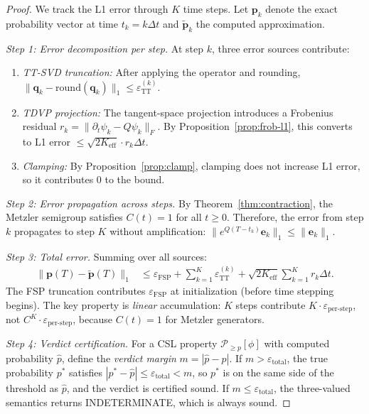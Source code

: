 \documentclass[11pt]{article}
\newcommand{\norm}[1]{\lVert #1 \rVert}
\begin{document}
\begin{proof}
We track the L1 error through $K$ time steps.
Let $\mathbf{p}_k$ denote the exact probability vector at time $t_k = k\Delta t$
and $\tilde{\mathbf{p}}_k$ the computed approximation.

\emph{Step 1: Error decomposition per step.}
At step $k$, three error sources contribute:
\begin{enumerate}[label=(\alph*)]
\item \emph{TT-SVD truncation:} After applying the operator and rounding,
  $\norm{\mathbf{q}_k - \mathrm{round}(\mathbf{q}_k)}_1 \leq \varepsilon_{\mathrm{TT}}^{(k)}$.
\item \emph{TDVP projection:} The tangent-space projection introduces
  a Frobenius residual $r_k = \norm{\partial_t \psi_k - Q\psi_k}_F$.
  By Proposition~\ref{prop:frob-l1}, this converts to L1 error
  $\leq \sqrt{2K_{\mathrm{eff}}} \cdot r_k \Delta t$.
\item \emph{Clamping:} By Proposition~\ref{prop:clamp}, clamping
  does not increase L1 error, so it contributes $0$ to the bound.
\end{enumerate}

\emph{Step 2: Error propagation across steps.}
By Theorem~\ref{thm:contraction}, the Metzler semigroup satisfies
$C(t) = 1$ for all $t \geq 0$.
Therefore, the error from step $k$ propagates to step $K$ without amplification:
$\norm{e^{Q(T-t_k)} \mathbf{e}_k}_1 \leq \norm{\mathbf{e}_k}_1$.

\emph{Step 3: Total error.}
Summing over all sources:
\begin{align}
  \norm{\mathbf{p}(T) - \tilde{\mathbf{p}}(T)}_1
  &\leq \varepsilon_{\mathrm{FSP}} + \sum_{k=1}^K \varepsilon_{\mathrm{TT}}^{(k)}
  + \sqrt{2K_{\mathrm{eff}}} \sum_{k=1}^K r_k \Delta t.
\end{align}
The FSP truncation contributes $\varepsilon_{\mathrm{FSP}}$ at initialization
(before time stepping begins).
The key property is \emph{linear} accumulation: $K$ steps contribute
$K \cdot \varepsilon_{\text{per-step}}$, not $C^K \cdot \varepsilon_{\text{per-step}}$,
because $C(t) = 1$ for Metzler generators.

\emph{Step 4: Verdict certification.}
For a CSL property $\mathcal{P}_{\geq p}[\phi]$ with computed probability $\hat{p}$,
define the \emph{verdict margin} $m = |\hat{p} - p|$.
If $m > \varepsilon_{\mathrm{total}}$, the true probability $p^*$
satisfies $|p^* - \hat{p}| \leq \varepsilon_{\mathrm{total}} < m$,
so $p^*$ is on the same side of the threshold as $\hat{p}$, and the
verdict is certified sound.
If $m \leq \varepsilon_{\mathrm{total}}$, the three-valued semantics
returns INDETERMINATE, which is always sound.
\end{proof}
\end{document}
